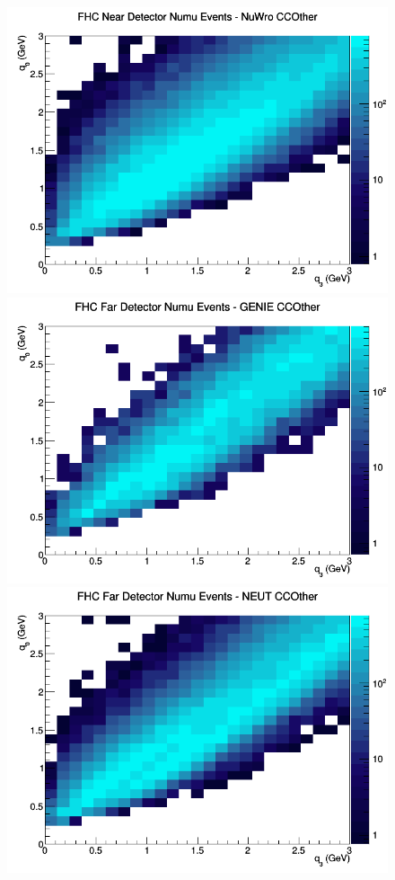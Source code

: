 \begin{figure}[h]
\includegraphics[width=\linewidth]{eff_q0_q3/LAr/CCOther_FHC_ND_numu_q3_q0_NuWro.png}
\endminipage
\newline
{}
\includegraphics[width=\linewidth]{eff_q0_q3/LAr/CCOther_FHC_FD_numu_q3_q0_GENIE.png}
\endminipage
{}
\includegraphics[width=\linewidth]{eff_q0_q3/LAr/CCOther_FHC_FD_numu_q3_q0_NEUT.png}

\end{figure}
